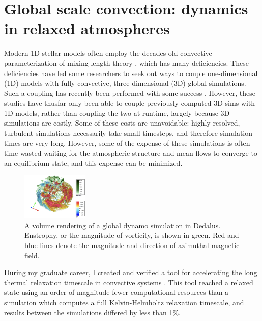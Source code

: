 \documentclass[11pt, preprint]{aastex}
\begin{document}
\section{Global scale convection: dynamics in relaxed atmospheres}
Modern 1D stellar models often employ the decades-old convective parameterization of mixing length theory \citep{bohm-vitense1958}, which has many deficiencies.
These deficiencies have led some researchers to seek out ways to couple one-dimensional (1D) models with fully convective, three-dimensional (3D) global simulations.
Such a coupling has recently been performed with some success \citep{jorgensen&weiss2019}.
However, these studies have thusfar only been able to couple previously computed 3D sims with 1D models, rather than coupling the two at runtime, largely because 3D simulations are costly.
Some of these costs are unavoidable: highly resolved, turbulent simulations necessarily take small timesteps, and therefore simulation times are very long.
However, some of the expense of these simulations is often time wasted waiting for the atmospheric structure and mean flows to converge to an equilibrium state, and this expense can be minimized.

\begin{figure}
	\begin{center}
	\vspace{-10pt}
    \includegraphics[width=0.28\textwidth]{./figs/mdwarf.png}
	\vspace{-16pt}
	\end{center}
    \caption{A volume rendering of a global dynamo simulation in Dedalus.
	Enstrophy, or the magnitude of vorticity, is shown in green.
	Red and blue lines denote the magnitude and direction of azimuthal magnetic field.
	\label{fig:mdwarf} }
\end{figure}
During my graduate career, I created and verified a tool for accelerating the long thermal relaxation timescale in convective systems \citep{anders&all2018}.
This tool reached a relaxed state using an order of magnitude fewer computational resources than a simulation which computes a full Kelvin-Helmholtz relaxation timescale, and results between the simulations differed by less than 1\%.
\end{document}
